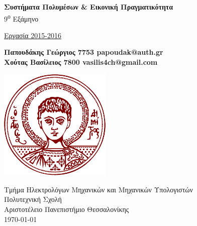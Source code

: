 \documentclass[12pt]{report}
\begin{document}
\setcounter{tocdepth}{3}

\begin{titlepage}
    \begin{center}
        \vspace*{1cm}

        \Large
        \textbf{Συστήματα Πολυμέσων \& Εικονική Πραγματικότητα}\\

        \large 9\textsuperscript{ο} Εξάμηνο


        \vspace*{0.5cm}

        \Huge
        \uline{Εργασία 2015-2016}\\

        \vspace{1.5cm}

        \large
        \textbf{Παπουδάκης Γεώργιος 7753 papoudak@auth.gr\\
          Χούτας Βασίλειος 7800 vasilis4ch@gmail.com}\\

        \vfill

        \vspace{0.8cm}

        \includegraphics[width=0.4\textwidth]{university}

        \vspace{0.8cm}

        \smallskip
        Τμήμα Ηλεκτρολόγων Μηχανικών και Μηχανικών Υπολογιστών\\
        Πολυτεχνική Σχολή
        \smallskip
        \\Αριστοτέλειο Πανεπιστήμιο Θεσσαλονίκης\\
        \today

    \end{center}
\end{titlepage}

\thispagestyle{empty}
\newpage

\tableofcontents
\listoftables
\listoffigures
\newpage






\end{document}
